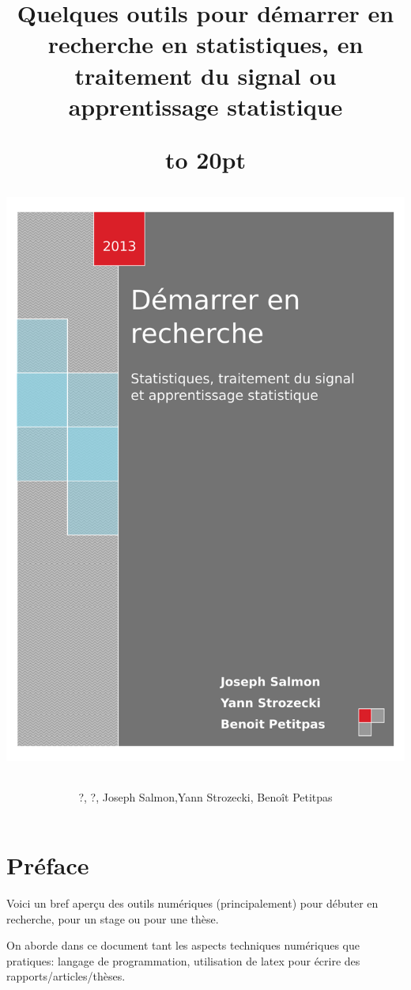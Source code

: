 \documentclass[a4paper,10pt]{book_ad}
\title{Quelques outils pour démarrer en recherche en statistiques, en traitement du signal
ou apprentissage statistique}
\author{?, ?, Joseph Salmon,Yann Strozecki, Benoît Petitpas}
\date {}
\begin{document}
\title{\vbox to 20pt{\vglue-280pt
\centerline{
\includegraphics{images/page-de-garde.pdf}
}
}
}

\author{}
\maketitle
\sloppy

\chapter*{Préface}

Voici un bref aperçu des outils numériques (principalement) pour débuter 
en recherche, pour un stage ou pour une thèse.

On aborde dans ce document tant les aspects techniques numériques que pratiques:
langage de programmation, utilisation de latex pour écrire des rapports/articles/thèses.
\end{document}
